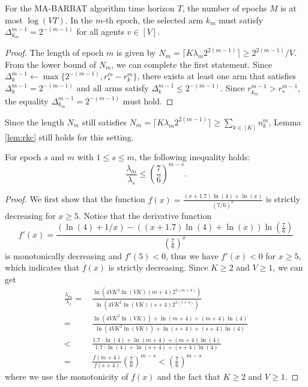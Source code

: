 \begin{lemma}
\label{lem:tnem} %
    For the MA-BARBAT algorithm time horizon $T$, the number of epochs $M$ is at most $\log(VT)$. In the $m$-th epoch, the selected arm $k_m$ must satisfy $\Delta_{k_m}^{m-1} = 2^{-(m-1)}$ for all agents $v \in [V]$.
\end{lemma}
\begin{proof}
    The length of epoch $m$ is given by $N_m = \lceil K \lambda_m 2^{2(m-1)} \rceil \geq 2^{2(m-1)} / V$. From the lower bound of $N_m$, we can complete the first statement. Since $\Delta_k^{m-1} \leftarrow \max\{2^{-(m-1)}, r_*^m - r_k^m\}$, there exists at least one arm that satisfies $\Delta_k^{m-1} = 2^{-(m-1)}$ and all arms satisfy $\Delta_k^{m-1} \leq 2^{-(m-1)}$. Since $r_{k_m}^{m-1} > r_{*}^{m-1}$, the equality $\Delta_{k_m}^{m-1} = 2^{-(m-1)}$ must hold.
\end{proof}
Since the length $N_m$ still satisfies $N_m = \lceil K \lambda_m 2^{2(m-1)} \rceil \geq \sum_{k \in [K]}n_k^m$, Lemma \ref{lem:rkc} still holds for this setting.
\begin{lemma}
\label{lem:trlm}    %
    For epoch $s$ and $m$ with $1\le s \leq m$, the following inequality holds:
    \[\frac{\lambda_m}{\lambda_s} \leq \left(\frac{7}{6}\right)^{m-s}.\]
\end{lemma}
\begin{proof}
    We first show that the function $f(x)=\frac{(x+1.7)\ln(4)+\ln(x)}{(7/6)^x}$
    is strictly decreasing for $x\ge 5$.
    Notice that the derivative function \[f'(x)=\frac{(\ln(4)+1/x)-((x+1.7)\ln(4)+\ln(x))\ln\left(\frac{7}{6}\right)}{\left(\frac{7}{6}\right)^{x}}\]
    is monotonically decreasing and $f'(5)<0$, thus we have $f'(x)<0$ for $x\ge 5$, which indicates that $f(x)$ is strictly decreasing.
    Since $K\ge 2$ and $V\ge 1$, we can get
    \begin{align*}
    \frac{\lambda_m}{\lambda_s}=&\, \frac{\ln(4VK^2\ln(VK)(m+4)2^{2(m+4)})}{\ln(4VK^2\ln(VK)(s+4)2^{2(s+4)})}\\
    =& \,\frac{\ln(4VK^2\ln(VK))+\ln(m+4)+(m+4)\ln(4)}{\ln(4VK^2\ln(VK))+\ln(s+4)+(s+4)\ln(4)}\\
    <& \,\frac{1.7\cdot\ln(4)+\ln(m+4)+(m+4)\ln(4)}{1.7\cdot\ln(4)+\ln(s+4)+(s+4)\ln(4)}\\
    =&\,\frac{f(m+4)}{f(s+4)}\left(\frac{7}{6}\right)^{m-s}<\left(\frac{7}{6}\right)^{m-s}
    \end{align*}
where we use the monotonicity of $f(x)$ and the fact that $K\ge 2$ and $V\ge 1$.
\end{proof}

